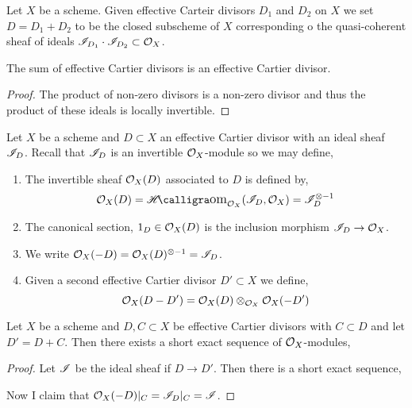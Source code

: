 \documentclass[12pt]{article}
\begin{document}
\begin{definition}
Let $X$ be a scheme. Given effective Carteir divisors $D_1$ and $D_2$ on $X$ we set $D = D_1 + D_2$ to be the closed subscheme of $X$ corresponding o the quasi-coherent sheaf of ideals $\mathscr{I}_{D_1} \cdot \mathscr{I}_{D_2} \subset \mathcal{O}_{X}$. 
\end{definition}

\begin{proposition}
The sum of effective Cartier divisors is an effective Cartier divisor.
\end{proposition}

\begin{proof}
The product of non-zero divisors is a non-zero divisor and thus the product of these ideals is locally invertible.
\end{proof}

\begin{definition}
Let $X$ be a scheme and $D \subset X$ an effective Cartier divisor with an ideal sheaf $\mathscr{I}_D$. Recall that $\mathscr{I}_D$ is an invertible $\mathcal{O}_{X}$-module so we may define,
\begin{enumerate}
\item The invertible sheaf $\mathcal{O}_{X}(D)$ associated to $D$ is defined by,
\[ \struct{X}(D) = \shHomover{\struct{X}}{\I_D}{\struct{X}} = \I_D^{\otimes - 1} \]
\item The canonical section, $1_D \in \mathcal{O}_{X}(D)$ is the inclusion morphism $\mathscr{I}_D \to \mathcal{O}_{X}$. 
\item We write $\mathcal{O}_{X}(-D) = \mathcal{O}_{X}(D)^{\otimes -1} = \mathscr{I}_D$.
\item Given a second effective Cartier divisor $D' \subset X$ we define,
\[ \mathcal{O}_{X}(D - D') = \mathcal{O}_{X}(D) \otimes_{\mathcal{O}_{X}} \mathcal{O}_{X}(-D') \]
\end{enumerate}
\end{definition}

\begin{lemma}
Let $X$ be a scheme and $D, C \subset X$ be effective Cartier divisors with $C \subset D$ and let $D' = D + C$. Then there exists a short exact sequence of $\mathcal{O}_{X}$-modules,
\begin{center}
\end{center}
\end{lemma}

\begin{proof}
Let $\mathscr{I}$ be the ideal sheaf if $D \to D'$. Then there is a short exact sequence,
\begin{center}
\end{center}
Now I claim that $\mathcal{O}_{X}(-D) |_C = \mathscr{I}_D |_C = \mathscr{I}$. 
\end{proof}
\end{document}

